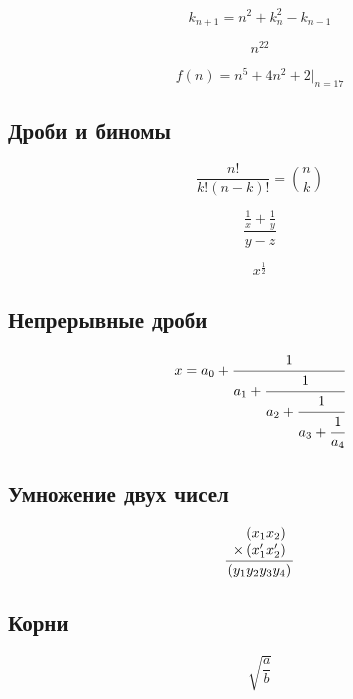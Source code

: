 \begin{equation}\label{eq:degrees_and_indices}
k_{n+1} = n^2 + k_n^2 - k_{n-1} 
\end{equation}

\begin{equation}
n^{22} 
\end{equation}

\begin{equation}
f(n) = n^5 + 4n^2 + 2 |_{n=17} 
\end{equation}

\subsection{Дроби и биномы}
\begin{equation}
\frac{n!}{k!(n-k)!} = \binom{n}{k} 
\end{equation}

\begin{equation}
\frac{\frac{1}{x}+\frac{1}{y}}{y-z} 
\end{equation}

\begin{equation}
x^\frac{1}{2} %
\end{equation}

\subsection{Непрерывные дроби}
\begin{equation}
  x = a_0 + \cfrac{1}{a_1 
          + \cfrac{1}{a_2 
          + \cfrac{1}{a_3 + \cfrac{1}{a_4} } } }
\end{equation}

\subsection{Умножение двух чисел}

\begin{equation}
\frac{
    \begin{array}[b]{r}
      \left( x_1 x_2 \right)\\
      \times \left( x'_1 x'_2 \right)
    \end{array}
  }{
    \left( y_1y_2y_3y_4 \right)
  }
\end{equation}

\subsection{Корни}
\begin{equation}
\sqrt{\frac{a}{b}}
\end{equation}


